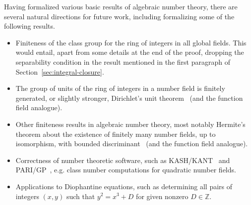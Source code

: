 \documentclass[a4paper,USenglish,cleveref, autoref, thm-restate]{lipics-v2021}
\newcommand{\Z}{\mathbb{Z}}
\begin{document}
Having formalized various basic results of algebraic number theory, there are several natural directions for future work, including formalizing some of the following results.
\begin{itemize}
\item Finiteness of the class group for the ring of integers in all global fields. This would entail, apart from some details at the end of the proof, dropping the separability condition in the result mentioned in the first paragraph of Section~\ref{sec:integral-closure}. 

\item The group of units of the ring of integers in a number field is finitely generated, or slightly stronger, Dirichlet's unit theorem~\cite[Theorem 7.4]{Neukirch} (and the function field analogue).

\item Other finiteness results in algebraic number theory, most notably Hermite's theorem about the existence of finitely many number fields, up to isomorphism,
with bounded discriminant~\cite[Theorem 2.16]{Neukirch} (and the function field analogue).

\item Correctness of number theoretic software, such as KASH/KANT~\cite{kash} and PARI/GP~\cite{PARI2}, e.g. class number computations for quadratic number fields.

\item Applications to Diophantine equations, such as determining all pairs of integers $(x,y)$ such that $y^2=x^3+D$ for %
given nonzero $D \in \Z$.
\end{itemize}
\end{document}
